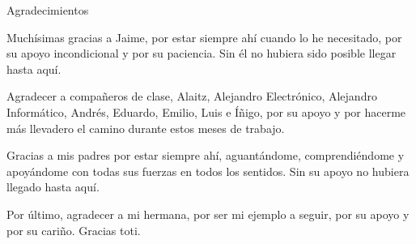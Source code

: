 \newpage
\thispagestyle{empty}

{ \flushright

\begin{LARGE}
Agradecimientos
\end{LARGE}

\hspace{3mm}

\begin{large}

Muchísimas gracias a Jaime, por estar siempre ahí cuando lo he necesitado, por su apoyo incondicional y por su paciencia. Sin él no hubiera sido posible llegar hasta aquí.

\bigskip

Agradecer a compañeros de clase, Alaitz, Alejandro Electrónico, Alejandro Informático, Andrés, Eduardo, Emilio, Luis e Íñigo, por su apoyo y por hacerme más llevadero el camino durante estos meses de trabajo.

\bigskip

Gracias a mis padres por estar siempre ahí, aguantándome, comprendiéndome y apoyándome con todas sus fuerzas en todos los sentidos. Sin su apoyo no hubiera llegado hasta aquí.

\bigskip

Por último, agradecer a mi hermana, por ser mi ejemplo a seguir, por su apoyo y por su cariño. Gracias toti.
\par

\end{large}

}